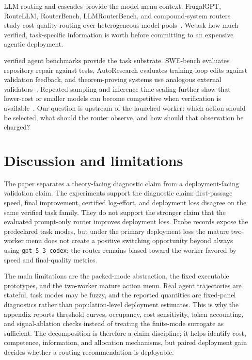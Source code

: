 \documentclass{article}
\begin{document}
LLM routing and cascades provide the model-menu context.
FrugalGPT, RouteLLM, RouterBench, LLMRouterBench, and compound-system routers study cost-quality routing over heterogeneous model pools~\citep{chen2023frugalgpt,ong2024routellm,hu2024routerbench,anonymous2026llmrouterbench,chen2025optimizing,yue2025masrouter,zaharia2024compound}.
We ask how much verified, task-specific information is worth before committing to an expensive agentic deployment.

verified agent benchmarks provide the task substrate.
SWE-bench evaluates repository repair against tests, AutoResearch evaluates training-loop edits against validation feedback, and theorem-proving systems use analogous external validators~\citep{jimenez2024swebench,karpathy2026autoresearch}.
Repeated sampling and inference-time scaling further show that lower-cost or smaller models can become competitive when verification is available~\citep{brown2024monkeys,snell2025testtime,wu2025inference,osca2024}.
Our question is upstream of the launched worker: which action should be selected, what should the router observe, and how should that observation be charged?

\section{Discussion and limitations}
\label{sec:discussion}

The paper separates a theory-facing diagnostic claim from a deployment-facing validation claim.
The experiments support the diagnostic claim: first-passage speed, final improvement, certified log-effort, and deployment loss disagree on the same verified task family.
They do not support the stronger claim that the evaluated prompt-only router improves deployment loss.
Probe records expose the predeclared task modes, but under the primary deployment loss the mature two-worker menu does not create a positive switching opportunity beyond always using \texttt{gpt\_5\_3\_codex}; the router remains biased toward the worker favored by speed and final-quality metrics.

The main limitations are the packed-mode abstraction, the fixed executable prototypes, and the two-worker mature action menu.
Real agent trajectories are stateful, task modes may be fuzzy, and the reported quantities are fixed-panel diagnostics rather than population-level deployment estimates.
This is why the appendix reports threshold curves, occupancy, cost sensitivity, token accounting, and signal-ablation checks instead of treating the finite-mode surrogate as sufficient.
The decomposition is therefore a claim discipline: it helps identify cost, competence, information, and allocation mechanisms, but paired deployment gain decides whether a routing recommendation is deployable.
\end{document}
